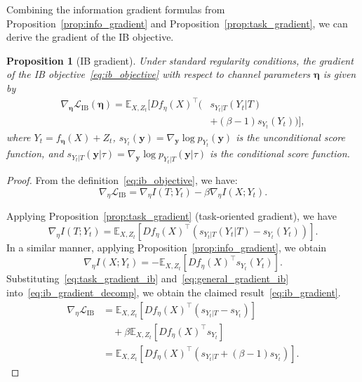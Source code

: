 \documentclass[conference]{IEEEtran}
\newtheorem{proposition}[theorem]{Proposition} %
\begin{document}
Combining the information gradient formulas from 
Proposition~\ref{prop:info_gradient} and 
Proposition~\ref{prop:task_gradient}, 
we can derive the gradient of the IB objective.
\begin{proposition}[IB gradient]
\label{prop:ib_gradient}
Under standard regularity conditions, the gradient 
of the IB objective~\eqref{eq:ib_objective} with respect to channel parameters $\bm \eta$ is given by
\begin{equation}
\begin{split}
\nabla_{\bm \eta} \mathcal{L}_{\text{IB}}(\bm \eta) = \mathbb{E}_{X,Z_t}\Big[ Df_\eta(X)^\top \big( &s_{Y_t|T}(Y_t|T) \\
&+(\beta-1) s_{Y_t}(Y_t) \big) \Big],
\end{split}
\label{eq:ib_gradient}
\end{equation}
where $Y_t = f_{\bm \eta}(X) + Z_t$, $s_{Y_t}(\bm y) = \nabla_{\bm y} \log p_{Y_t}(\bm y)$ is the unconditional score function, and $s_{Y_t|T}(\bm y|\tau) = \nabla_{\bm y} \log p_{Y_t|T}(\bm y|\tau)$ is the conditional score function.
\end{proposition}

\begin{proof}
From the definition~\eqref{eq:ib_objective}, we have:
\begin{equation}
\nabla_\eta \mathcal{L}_{\text{IB}} = \nabla_\eta I(T; Y_t) - \beta \nabla_\eta I(X; Y_t).
\label{eq:ib_gradient_decomp}
\end{equation}

Applying Proposition~\ref{prop:task_gradient} (task-oriented gradient), we have
\begin{equation}
\nabla_\eta I(T; Y_t) = \mathbb{E}_{X,Z_t}\left[Df_\eta(X)^\top \left(s_{Y_t|T}(Y_t|T) - s_{Y_t}(Y_t)\right)\right].
\label{eq:task_gradient_ib}
\end{equation}
In a similar manner, applying Proposition~\ref{prop:info_gradient}, we obtain
\begin{equation}
\nabla_\eta I(X; Y_t) = -\mathbb{E}_{X,Z_t}\left[Df_\eta(X)^\top s_{Y_t}(Y_t)\right].
\label{eq:general_gradient_ib}
\end{equation}
Substituting~\eqref{eq:task_gradient_ib} and~\eqref{eq:general_gradient_ib} into~\eqref{eq:ib_gradient_decomp}, we obtain the claimed result~\eqref{eq:ib_gradient}.
\begin{equation}
\begin{split}
\nabla_\eta \mathcal{L}_{\text{IB}} &= \mathbb{E}_{X,Z_t}\left[Df_\eta(X)^\top \left(s_{Y_t|T} - s_{Y_t}\right)\right] \\
&\quad + \beta \mathbb{E}_{X,Z_t}\left[Df_\eta(X)^\top s_{Y_t}\right] \\
&= \mathbb{E}_{X,Z_t}\left[Df_\eta(X)^\top \left(s_{Y_t|T} + (\beta-1) s_{Y_t}\right)\right].
\end{split}
\end{equation}
\end{proof}
\end{document}
